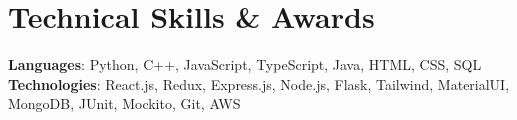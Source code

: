 \section{Technical Skills \& Awards}
\begin{itemize}[leftmargin=0.15in, label={}]
    \small{\item{     
        \textbf{Languages}{: Python, C++, JavaScript, TypeScript, Java, HTML, CSS, SQL} \\
     
        \textbf{Technologies}{: React.js, Redux, Express.js, Node.js, Flask, Tailwind, MaterialUI, MongoDB, JUnit, Mockito, Git, AWS} \\
    }}
\end{itemize}